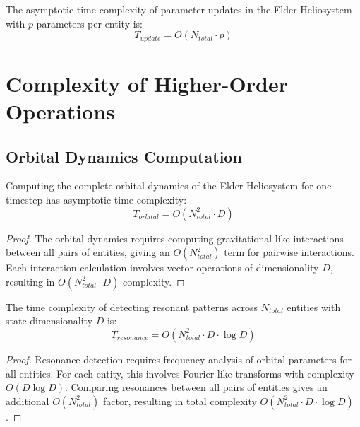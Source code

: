 \begin{theorem}
The asymptotic time complexity of parameter updates in the Elder Heliosystem with $p$ parameters per entity is:
\begin{equation}
T_{update} = O(N_{total} \cdot p)
\end{equation}
\end{theorem}

\section{Complexity of Higher-Order Operations}

\subsection{Orbital Dynamics Computation}

\begin{theorem}
Computing the complete orbital dynamics of the Elder Heliosystem for one timestep has asymptotic time complexity:
\begin{equation}
T_{orbital} = O(N_{total}^2 \cdot D)
\end{equation}
\end{theorem}

\begin{proof}
The orbital dynamics requires computing gravitational-like interactions between all pairs of entities, giving an $O(N_{total}^2)$ term for pairwise interactions. Each interaction calculation involves vector operations of dimensionality $D$, resulting in $O(N_{total}^2 \cdot D)$ complexity.
\end{proof}

\begin{theorem}
The time complexity of detecting resonant patterns across $N_{total}$ entities with state dimensionality $D$ is:
\begin{equation}
T_{resonance} = O(N_{total}^2 \cdot D \cdot \log D)
\end{equation}
\end{theorem}

\begin{proof}
Resonance detection requires frequency analysis of orbital parameters for all entities. For each entity, this involves Fourier-like transforms with complexity $O(D \log D)$. Comparing resonances between all pairs of entities gives an additional $O(N_{total}^2)$ factor, resulting in total complexity $O(N_{total}^2 \cdot D \cdot \log D)$.
\end{proof}


